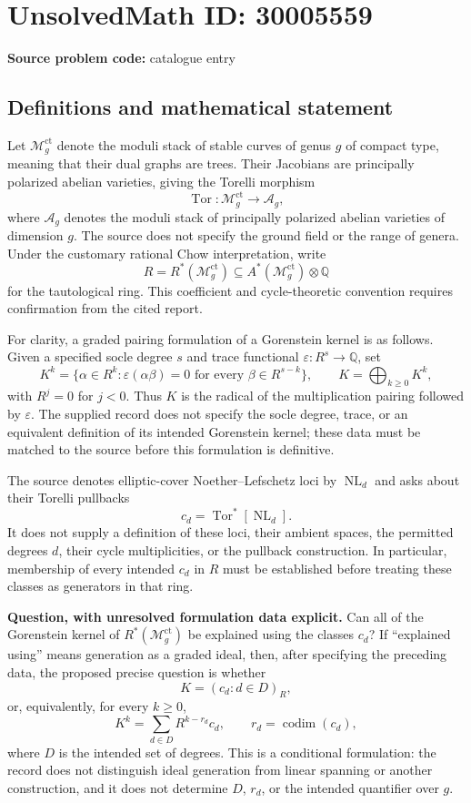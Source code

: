 \documentclass[11pt]{article}
\newcommand{\Q}{\mathbb{Q}}
\begin{document}
\section*{UnsolvedMath ID: 30005559}
\textbf{Source problem code:} catalogue entry
\subsection{Definitions and mathematical statement}
Let \(\mathcal M_g^{\mathrm{ct}}\) denote the moduli stack of stable curves of genus \(g\) of compact type, meaning that their dual graphs are trees. Their Jacobians are principally polarized abelian varieties, giving the Torelli morphism
\[
\operatorname{Tor}\colon \mathcal M_g^{\mathrm{ct}}\longrightarrow \mathcal A_g,
\]
where \(\mathcal A_g\) denotes the moduli stack of principally polarized abelian varieties of dimension \(g\). The source does not specify the ground field or the range of genera. Under the customary rational Chow interpretation, write
\[
R=R^*(\mathcal M_g^{\mathrm{ct}})
\subseteq A^*(\mathcal M_g^{\mathrm{ct}})\otimes\Q
\]
for the tautological ring. This coefficient and cycle-theoretic convention requires confirmation from the cited report.

For clarity, a graded pairing formulation of a Gorenstein kernel is as follows. Given a specified socle degree \(s\) and trace functional \(\varepsilon\colon R^s\to\Q\), set
\[
K^k=\{\alpha\in R^k:\varepsilon(\alpha\beta)=0
\text{ for every }\beta\in R^{s-k}\},
\qquad K=\bigoplus_{k\geq0}K^k,
\]
with \(R^j=0\) for \(j<0\). Thus \(K\) is the radical of the multiplication pairing followed by \(\varepsilon\). The supplied record does not specify the socle degree, trace, or an equivalent definition of its intended Gorenstein kernel; these data must be matched to the source before this formulation is definitive.

The source denotes elliptic-cover Noether--Lefschetz loci by \(\operatorname{NL}_d\) and asks about their Torelli pullbacks
\[
c_d=\operatorname{Tor}^*[\operatorname{NL}_d].
\]
It does not supply a definition of these loci, their ambient spaces, the permitted degrees \(d\), their cycle multiplicities, or the pullback construction. In particular, membership of every intended \(c_d\) in \(R\) must be established before treating these classes as generators in that ring.

\textbf{Question, with unresolved formulation data explicit.} Can all of the Gorenstein kernel of \(R^*(\mathcal M_g^{\mathrm{ct}})\) be explained using the classes \(c_d\)? If ``explained using'' means generation as a graded ideal, then, after specifying the preceding data, the proposed precise question is whether
\[
K=(c_d:d\in D)_R,
\]
or, equivalently, for every \(k\geq0\),
\[
K^k=\sum_{d\in D}R^{k-r_d}c_d,
\qquad r_d=\operatorname{codim}(c_d),
\]
where \(D\) is the intended set of degrees. This is a conditional formulation: the record does not distinguish ideal generation from linear spanning or another construction, and it does not determine \(D\), \(r_d\), or the intended quantifier over \(g\).
\end{document}
